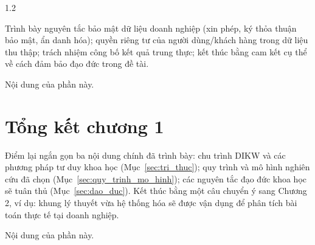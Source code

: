 \begin{spacing}{1.2}
\begin{huongdan}
Trình bày nguyên tắc bảo mật dữ liệu doanh nghiệp (xin phép, ký thỏa thuận bảo mật, ẩn danh hóa); quyền riêng tư của người dùng/khách hàng trong dữ liệu thu thập; trách nhiệm công bố kết quả trung thực; kết thúc bằng cam kết cụ thể về cách đảm bảo đạo đức trong đề tài.
\end{huongdan}

Nội dung của phần này.

\section{Tổng kết chương 1}
\label{sec:tong_ket_c1}

\begin{huongdan}
Điểm lại ngắn gọn ba nội dung chính đã trình bày: chu trình DIKW và các phương pháp tư duy khoa học (Mục~\ref{sec:tri_thuc}); quy trình và mô hình nghiên cứu đã chọn (Mục~\ref{sec:quy_trinh_mo_hinh}); các nguyên tắc đạo đức khoa học sẽ tuân thủ (Mục~\ref{sec:dao_duc}). Kết thúc bằng một câu chuyển ý sang Chương 2, ví dụ: khung lý thuyết vừa hệ thống hóa sẽ được vận dụng để phân tích bài toán thực tế tại doanh nghiệp.
\end{huongdan}

Nội dung của phần này.

\end{spacing}
